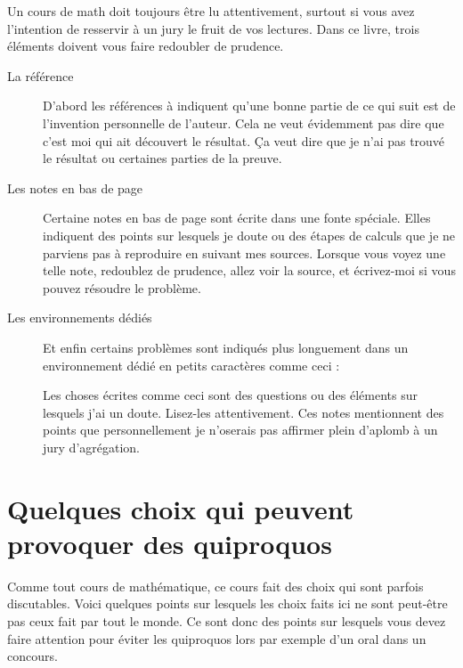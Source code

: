 Un cours de math doit toujours être lu attentivement, surtout si vous avez l'intention de resservir à un jury le fruit de vos lectures. Dans ce livre, trois éléments doivent vous faire redoubler de prudence.

\begin{description}
    \item[La référence \cite{MonCerveau}] 
        D'abord les références à \cite{MonCerveau} indiquent qu'une bonne partie de ce qui suit est de l'invention personnelle de l'auteur. Cela ne veut évidemment pas dire que c'est moi qui ait découvert le résultat. Ça veut dire que je n'ai pas trouvé le résultat ou certaines parties de la preuve.
    \item[Les notes en bas de page]
        Certaine notes en bas de page sont écrite dans une fonte spéciale. Elles indiquent des points sur lesquels je doute ou des étapes de calculs que je ne parviens pas à reproduire en suivant mes sources. Lorsque vous voyez une telle note, redoublez de prudence, allez voir la source, et écrivez-moi si vous pouvez résoudre le problème.
    \item[Les environnements dédiés]       
        Et enfin certains problèmes sont indiqués plus longuement dans un environnement dédié en petits caractères comme ceci :

        \begin{probleme}
            Les choses écrites comme ceci sont des questions ou des éléments sur lesquels j'ai un doute. Lisez-les attentivement. Ces notes mentionnent des points que personnellement je n'oserais pas affirmer plein d'aplomb à un jury d'agrégation.
        \end{probleme}
\end{description}

\section{Quelques choix qui peuvent provoquer des quiproquos}

Comme tout cours de mathématique, ce cours fait des choix qui sont parfois discutables. Voici quelques points sur lesquels les choix faits ici ne sont peut-être pas ceux fait par tout le monde. Ce sont donc des points sur lesquels vous devez faire attention pour éviter les quiproquos lors par exemple d'un oral dans un concours.

